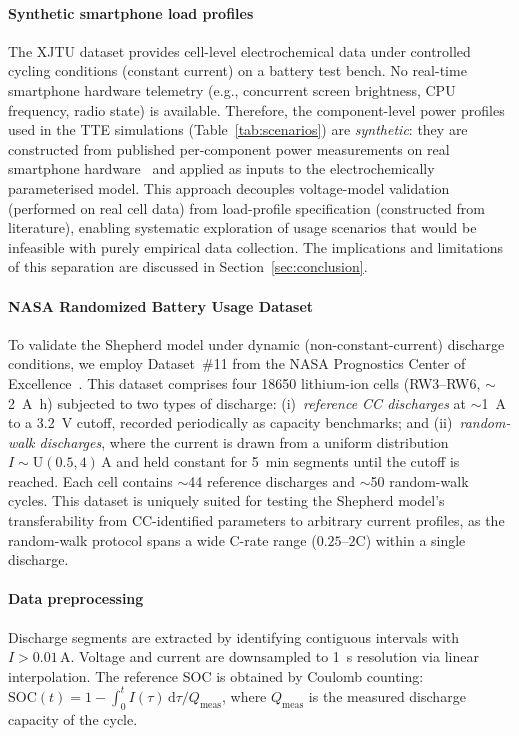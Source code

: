 \documentclass[5p,times,number]{elsarticle}
\newcommand{\tabref}[1]{\hyperref[#1]{\textup{Table~\ref*{#1}}}}
\newcommand{\secref}[1]{\hyperref[#1]{\textup{Section~\ref*{#1}}}}
\def\tabref#1{Table~\ref{#1}}
\def\secref#1{Section~\ref{#1}}
\begin{document}
\paragraph{Synthetic smartphone load profiles}
The XJTU dataset provides cell-level electrochemical data under controlled cycling conditions (constant current) on a battery test bench.
No real-time smartphone hardware telemetry (e.g., concurrent screen brightness, CPU frequency, radio state) is available.
Therefore, the component-level power profiles used in the TTE simulations (\tabref{tab:scenarios}) are \emph{synthetic}: they are constructed from published per-component power measurements on real smartphone hardware~\cite{Carroll2010,Chen2014,Lu2008,Murmuria2012} and applied as inputs to the electrochemically parameterised model.
This approach decouples voltage-model validation (performed on real cell data) from load-profile specification (constructed from literature), enabling systematic exploration of usage scenarios that would be infeasible with purely empirical data collection.
The implications and limitations of this separation are discussed in \secref{sec:conclusion}.

\paragraph{NASA Randomized Battery Usage Dataset}
To validate the Shepherd model under dynamic (non-constant-current) discharge conditions, we employ Dataset~\#11 from the NASA Prognostics Center of Excellence~\cite{Bole2014}.
This dataset comprises four 18650 lithium-ion cells (RW3--RW6, $\sim$\SI{2}{\ampere\hour}) subjected to two types of discharge:
(i)~\emph{reference CC discharges} at $\sim$\SI{1}{\ampere} to a \SI{3.2}{\volt} cutoff, recorded periodically as capacity benchmarks; and
(ii)~\emph{random-walk discharges}, where the current is drawn from a uniform distribution $I \sim \mathrm{U}(0.5, 4)$\,A and held constant for \SI{5}{\minute} segments until the cutoff is reached.
Each cell contains $\sim$44 reference discharges and $\sim$50 random-walk cycles.
This dataset is uniquely suited for testing the Shepherd model's transferability from CC-identified parameters to arbitrary current profiles, as the random-walk protocol spans a wide C-rate range ($0.25$--$2$C) within a single discharge.

\paragraph{Data preprocessing}
Discharge segments are extracted by identifying contiguous intervals with $I > 0.01$\,A.
Voltage and current are downsampled to \SI{1}{\second} resolution via linear interpolation.
The reference SOC is obtained by Coulomb counting:
$\mathrm{SOC}(t) = 1 - \int_0^t I(\tau)\,\mathrm{d}\tau / Q_{\mathrm{meas}}$,
where $Q_{\mathrm{meas}}$ is the measured discharge capacity of the cycle.
\end{document}
